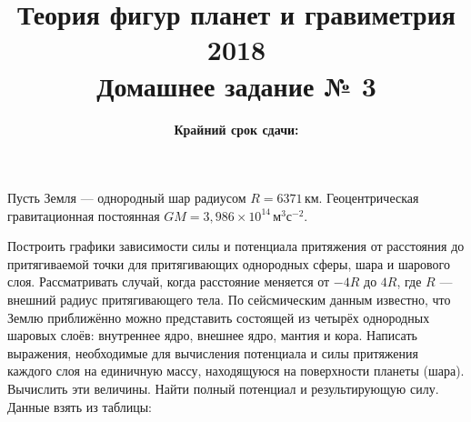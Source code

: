 \documentclass[11pt, a4paper,addpoints]{exam}
\title{{\Large Теория фигур планет и гравиметрия 2018}\\ 
    {\bf\Large Домашнее задание № 3}}
\author{}
\date{\normalsize\bf Крайний срок сдачи: \DTMusedate{deadline}}
\theoremstyle{remark}
\begin{document}
\maketitle
\thispagestyle{empty}
\begin{questions}
    \question[1] Пусть Земля --- однородный шар радиусом $R = 6371\,\text{км}$. Геоцентрическая
    гравитационная постоянная $GM = 3,986\times10^{14}\,\text{м}^3\text{с}^{-2}$.
    \question[1] Построить графики зависимости силы и потенциала притяжения от расстояния до
    притягиваемой точки для притягивающих однородных сферы, шара и шарового слоя. Рассматривать
    случай, когда расстояние меняется от $-4R$ до $4R$, где $R$ --- внешний радиус притягивающего
    тела.
    \question[1] По сейсмическим данным известно, что Землю приближённо можно представить состоящей 
    из четырёх однородных шаровых слоёв: внутреннее ядро, внешнее ядро, мантия и кора. 
    Написать выражения, необходимые для 
    вычисления потенциала и силы притяжения каждого слоя на единичную массу, находящуюся на поверхности 
    планеты (шара). Вычислить эти величины. Найти полный потенциал и результирующую силу.
    Данные взять из таблицы:
    \begin{table}[h]

\end{table}
\end{questions}
\end{document}
